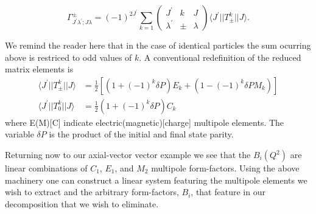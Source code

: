 \begin{equation}
 \Gamma_{J^\prime\lambda^\prime;J\lambda}^\pm = \left(-1\right)^{2J^\prime} \sum_{k=1}
  \begin{pmatrix} J^\prime & k & J \\
 \lambda^\prime & \pm & \lambda  \end{pmatrix} 
 \langle J^\prime || T^k_\pm || J \rangle  .
\end{equation}

We remind the reader here that in the case of identical particles the sum ocurring above is restriced to odd values of $k$. A conventional redefinition of the reduced matrix elements is 
\begin{align*}
 \langle J^\prime || T^k_\pm || J \rangle &= \frac{1}{2}\left[ \left(1 + (-1)^k\delta P\right)E_k + \left(1 - (-1)^k \delta P M_k \right) \right] \\
  \langle J^\prime || T^k_0 || J \rangle &= \frac{1}{2} \left(1 + (-1)^k\delta P\right)C_k 
\end{align*} 
where E(M)[C] indicate electric(magnetic)[charge] multipole elements. The variable $\delta P$ is the product of the initial and final state parity. 

Returning now to our axial-vector vector example we see that the $B_i(Q^2)$ are linear combinations of $C_1$, $E_1$, and $M_2$ multipole form-factors. Using the above machinery one can construct a linear system featuring the multipole elements we wish to extract and the arbitrary form-factors, $B_i$, that feature in our decomposition that we wish to eliminate. 







